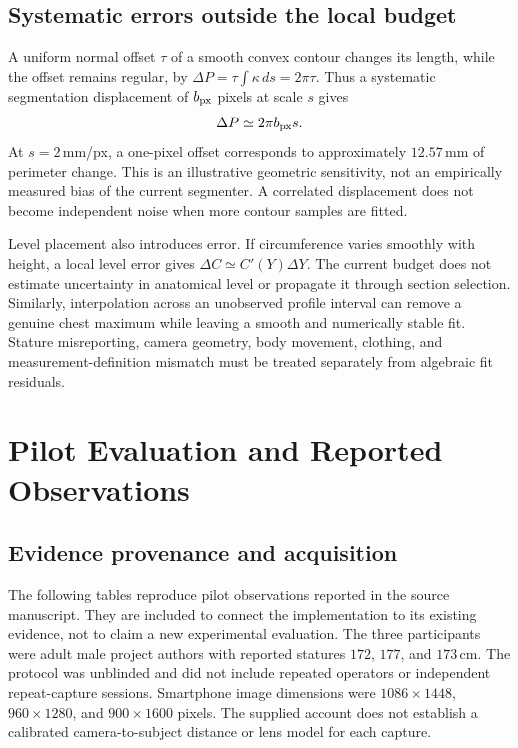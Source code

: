 \subsection{Systematic errors outside the local budget}
\label{subsec:systematic_errors}
A uniform normal offset $\tau$ of a smooth convex contour changes its length, while the offset remains regular, by $\Delta P=\tau\int\kappa\,ds=2\pi\tau$. Thus a systematic segmentation displacement of $b_{\rm px}$ pixels at scale $s$ gives
\begin{equation}
\Delta P\simeq2\pi b_{\rm px}s.
\label{eq:boundary_bias}
\end{equation}
At $s=2$\,mm/px, a one-pixel offset corresponds to approximately $12.57$\,mm of perimeter change. This is an illustrative geometric sensitivity, not an empirically measured bias of the current segmenter. A correlated displacement does not become independent noise when more contour samples are fitted.

Level placement also introduces error. If circumference varies smoothly with height, a local level error gives $\Delta C\simeq C'(Y)\Delta Y$. The current budget does not estimate uncertainty in anatomical level or propagate it through section selection. Similarly, interpolation across an unobserved profile interval can remove a genuine chest maximum while leaving a smooth and numerically stable fit. Stature misreporting, camera geometry, body movement, clothing, and measurement-definition mismatch must be treated separately from algebraic fit residuals.

\section{Pilot Evaluation and Reported Observations}
\label{sec:pilot}
\subsection{Evidence provenance and acquisition}
The following tables reproduce pilot observations reported in the source manuscript. They are included to connect the implementation to its existing evidence, not to claim a new experimental evaluation. The three participants were adult male project authors with reported statures $172$, $177$, and $173$\,cm. The protocol was unblinded and did not include repeated operators or independent repeat-capture sessions. Smartphone image dimensions were $1086\times1448$, $960\times1280$, and $900\times1600$ pixels. The supplied account does not establish a calibrated camera-to-subject distance or lens model for each capture.

